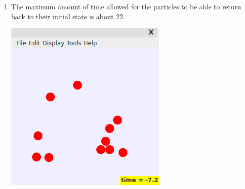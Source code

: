 \documentclass{article}
\newenvironment{problem}[2][Problem]{\begin{trivlist}
\item[\hskip \labelsep {\bfseries #1}\hskip \labelsep {\bfseries #2.}]}{\end{trivlist}}
\begin{document}
\begin{problem}{(Irreversibility)}
\begin{enumerate}[label=\alph*)]
                \item The maximum amount of time allowed for the particles to be able to return back to their initial state is about 22. 

                        \includegraphics[scale=0.2]{3c.png}

        \end{enumerate}
\end{problem}




\end{document}
